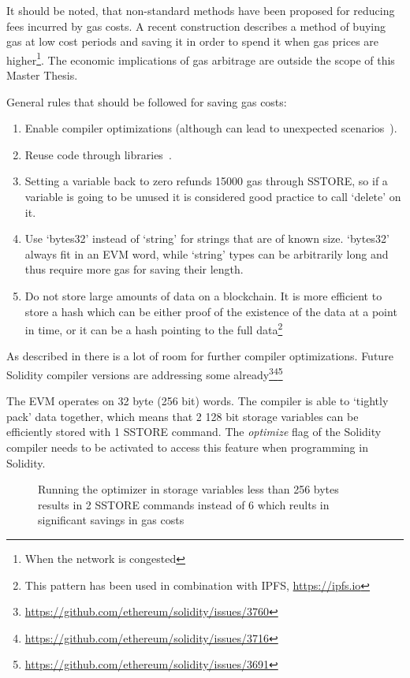 It should be noted, that non-standard methods have been proposed for reducing fees incurred by gas costs. A recent construction \cite{gastoken} describes a method of buying gas at low cost periods and saving it in order to spend it when gas prices are higher\footnote{When the network is congested}. The economic implications of gas arbitrage are outside the scope of this Master Thesis. 

General rules that should be followed for saving gas costs:
\begin{enumerate}
    \item Enable compiler optimizations (although can lead to unexpected scenarios~\cite{compiler}).
    \item Reuse code through libraries~\cite{library}.
    \item Setting a variable back to zero refunds 15000 gas through SSTORE, so if a variable is going to be unused it is considered good practice to call `delete' on it. 
    \item Use `bytes32' instead of `string' for strings that are of known size. `bytes32' always fit in an EVM word, while `string' types can be arbitrarily long and thus require more gas for saving their length.
    \item Do not store large amounts of data on a blockchain. It is more efficient to store a hash which can be either proof of the existence of the data at a point in time, or it can be a hash pointing to the full data\footnote{This pattern has been used in combination with IPFS, \url{https://ipfs.io}}
\end{enumerate}

As described in \cite{DBLP:journals/corr/ChenLLZ17} there is a lot of room for further compiler optimizations. Future Solidity compiler versions are addressing some already\footnote{\url{https://github.com/ethereum/solidity/issues/3760}}\footnote{\url{https://github.com/ethereum/solidity/issues/3716}}\footnote{\url{https://github.com/ethereum/solidity/issues/3691}}

The EVM operates on 32 byte (256 bit) words. The compiler is able to `tightly pack' data together, which means that 2 128 bit storage variables can be efficiently stored with 1 SSTORE command. The \textit{optimize} flag of the Solidity compiler needs to be activated to access this feature when programming in Solidity.

\begin{figure}[H]
  \begin{subfigure}[b]{\textwidth}
    \centering
    
  \end{subfigure}

  \begin{subfigure}[b]{\textwidth}
    \centering
    
  \end{subfigure}
  \label{fig:struct_optimization}
  \caption{Running the optimizer in storage variables less than 256 bytes results in 2 SSTORE commands instead of 6 which reults in significant savings in gas costs}
\end{figure}

